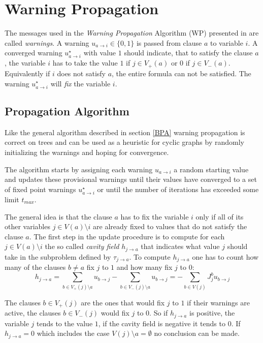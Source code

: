 \section{Warning Propagation}

The messages used in the \emph{Warning Propagation} Algorithm (WP) presented in \cite{survprob} are called \emph{warnings}. A warning $u_{a\rightarrow i} \in \{0, 1\}$ is passed from clause $a$ to variable $i$. A converged warning  $u^{\star}_{a\rightarrow i}$ with value $1$ should indicate, that  to satisfy the clause $a$, the variable $i$ has to take the value $1$ if $j \in V_+(a)$ or $0$ if $j \in V_-(a)$. Equivalently if $i$ does not satisfy $a$, the entire formula can not be satisfied. The warning $u^{\star}_{a \rightarrow i}$ will \emph{fix} the variable $i$. 
\subsection{Propagation Algorithm}

Like the general algorithm described in section \ref{BPA} warning propagation is correct on trees and can be used as a heuristic for cyclic graphs by randomly initializing the warnings and hoping for convergence.

The algorithm starts by assigning each warning $u_{a\rightarrow i}$ a random starting value and updates these provisional warnings until their values have converged to a set of fixed point warnings $u^{\star}_{a \rightarrow i}$ or until the number of iterations has exceeded some limit $t_{max}$.

The general idea is that the clause $a$ has to fix the variable $i$ only if all of its other variables $j \in V(a)\setminus i$ are already fixed to values that do not satisfy the clause $a$. \newline
The first step in the update procedure is to compute for each $j \in V(a) \setminus i$ the so called \emph{cavity field} $h_{j \rightarrow a}$ that indicates what value $j$ should take in the subproblem defined by $\tau_{j \rightarrow a}$. To compute $h_{j \rightarrow a}$ one has to count how many of the clauses $b \neq a$ fix $j$ to $1$ and how many fix $j$ to $0$:
$$h_{j \rightarrow a} = \sum_{b \in V_+(j)\setminus a}{u_{b \rightarrow j}} - \sum_{b \in V_-(j)\setminus a}{u_{b \rightarrow j}} = -\sum_{b \in V(j)} J^b_j u_{b \rightarrow j}$$

The clauses $b \in V_+(j)$ are the ones that would fix $j$ to $1$ if their warnings are active, the clauses $b \in V_-(j)$ would fix $j$ to $0$.
So if $h_{j \rightarrow a}$ is positive, the variable $j$ tends to the value $1$, if the cavity field is negative it tends to $0$. If $h_{j \rightarrow a} = 0$ which includes the case $V(j) \setminus a = \emptyset$ no conclusion can be made.

